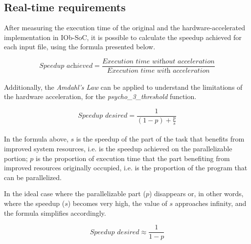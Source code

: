 \subsection{Real-time requirements}


After measuring the execution time of the original and the hardware-accelerated implementation in IOb-SoC, it is possible to calculate the speedup achieved for each input file, using the formula presented below.

\begin{equation}
    \textit{Speedup achieved} = \frac{\textit{Execution time without acceleration}}{\textit{Execution time with acceleration}} 
\end{equation}\\

Additionally, the \textit{Amdahl's Law} can be applied to understand the limitations of the hardware acceleration, for the \textit{psycho\_3\_threshold} function.

\begin{equation}
    \textit{Speedup desired} = \frac{1}{(1 - p) + \frac{p}{s}} 
\end{equation}\\

In the formula above, $s$ is the speedup of the part of the task that benefits from improved system resources, i.e. is the speedup achieved on the parallelizable portion; $p$ is the proportion of execution time that the part benefiting from improved resources originally occupied, i.e. is the proportion of the program that can be parallelized.

In the ideal case where the parallelizable part ($p$) disappears or, in other words, where the speedup ($s$) becomes very high, the value of $s$ approaches infinity, and the formula simplifies accordingly.

\begin{equation}
    \textit{Speedup desired} \approx \frac{1}{1 - p}
\end{equation}\\

